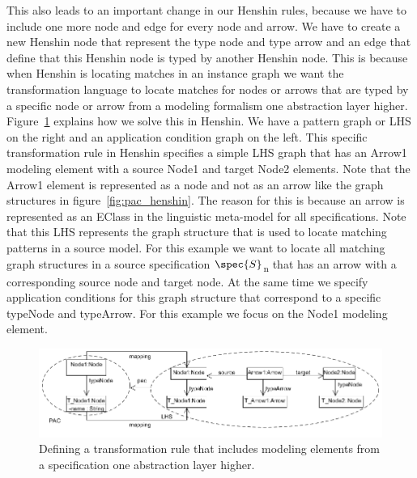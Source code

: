This also leads to an important change in our Henshin rules, because we have to
include one more node and edge for every node and arrow. We have to create a new
Henshin node that represent the type node and type arrow and an edge that define
that this Henshin node is typed by another Henshin node. This is because when
Henshin is locating matches in an instance graph we want the transformation
language to locate matches for nodes or arrows that are typed by a specific
node or arrow from a modeling formalism one abstraction layer higher.
Figure~\ref{fig:pac_henshin_condition} explains how we solve this in Henshin.
We have a pattern graph or LHS on the right and an application condition graph
on the left. This specific transformation rule in Henshin specifies a simple LHS graph
that has an Arrow1 modeling element with a source Node1 and target Node2
elements. Note that the Arrow1 element is represented as a node and not as
an arrow like the graph structures in figure~\ref{fig:pac_henshin}. The reason
for this is because an arrow is represented as an EClass in the linguistic
meta-model for all specifications. Note that this LHS represents the graph
structure that is used to locate matching patterns in a source model. For this
example we want to locate all matching graph structures in a source
specification $\spec{S}$\textsubscript{n} that has an arrow with a
corresponding source node and target node. At the same time we specify
application conditions for this graph structure that correspond to a specific
typeNode and typeArrow. For this example we focus on the Node1 modeling
element.

\begin{figure}[H] 
	\centering
	\includegraphics[scale=0.7]{./Figures/PAC_to_Henshin.png}
	\caption[How to handle node types for a rule in Henshin]
	{Defining a transformation rule that includes modeling elements from a
	specification one abstraction layer higher.}
	\label{fig:pac_henshin_condition}
\end{figure}

